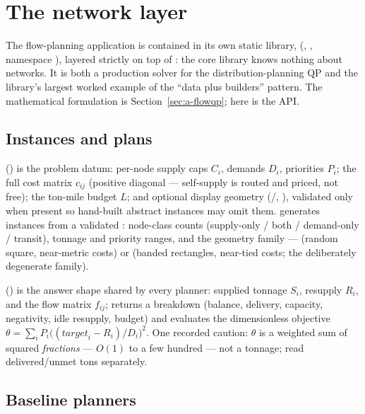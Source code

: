 \section{The network layer}
\label{sec:network}

The flow-planning application is contained in its own static library,
 (, , namespace
), layered strictly on top of : the core
library knows nothing about networks. It is both a production solver for the
distribution-planning QP and the library's largest worked example of the
``data plus builders'' pattern. The mathematical formulation is
Section~\ref{sec:a-flowqp}; here is the API.

\subsection{Instances and plans}

 () is the problem datum: per-node supply
caps $C_i$, demands $D_i$, priorities $P_i$; the full cost matrix $c_{ij}$
(positive diagonal --- self-supply is routed and priced, not free); the
ton-mile budget  $L$; and optional display geometry
(/, ), validated only when present so
hand-built abstract instances may omit them.  generates instances from a validated : node-class
counts (supply-only / both / demand-only / transit), tonnage and priority
ranges, and the geometry family ---  (random square,
near-metric costs) or  (banded rectangles, near-tied costs; the
deliberately degenerate family).

 () is the answer shape shared by every planner:
supplied tonnage $S_i$, resupply $R_i$, and the flow matrix $f_{ij}$;
 returns a  breakdown (balance,
delivery, capacity, negativity, idle resupply, budget) and
 evaluates the dimensionless objective
$\theta = \sum_i P_i \bigl((\mathit{target}_i - R_i)/D_i\bigr)^2$. One
recorded caution: $\theta$ is a weighted sum of squared \emph{fractions} ---
$O(1)$ to a few hundred --- not a tonnage; read delivered/unmet tons
separately.

\subsection{Baseline planners}

